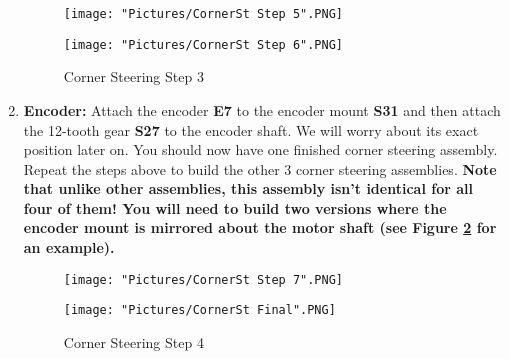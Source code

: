 \documentclass[12pt]{article}
\begin{document}
\begin{enumerate}
\begin{figure}[H]
  \centering
  \begin{minipage}[b]{0.45\textwidth}
    \texttt{[image: "Pictures/CornerSt Step 5".PNG]}
  \end{minipage}
  \hfill
  \begin{minipage}[b]{0.45\textwidth}
    \texttt{[image: "Pictures/CornerSt Step 6".PNG]}
  \end{minipage}
  \caption{Corner Steering Step 3}
  \label{corner steering 3}
\end{figure}

\item \textbf{Encoder:} Attach the encoder \textbf{E7} to the encoder mount \textbf{S31} and then attach the 12-tooth gear \textbf{S27} to the encoder shaft. We will worry about its exact position later on. You should now have one finished corner steering assembly. Repeat the steps above to build the other 3 corner steering assemblies. \textbf{Note that unlike other assemblies, this assembly isn't identical for all four of them! You will need to build two versions where the encoder mount is mirrored about the motor shaft (see Figure \ref{corner steering 4} for an example).} 

\begin{figure}[H]
  \centering
  \begin{minipage}[b]{0.45\textwidth}
    \texttt{[image: "Pictures/CornerSt Step 7".PNG]}
  \end{minipage}
  \hfill
  \begin{minipage}[b]{0.45\textwidth}
    \texttt{[image: "Pictures/CornerSt Final".PNG]}
  \end{minipage}
  \caption{Corner Steering Step 4}
  \label{corner steering 4}
\end{figure}

\end{enumerate}
\end{document}
